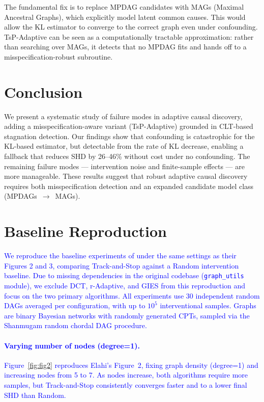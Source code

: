 \documentclass{article}
\newcommand{\added}[1]{\textcolor{blue}{#1}}
\begin{document}
The fundamental fix is to replace MPDAG candidates with MAGs (Maximal Ancestral Graphs), which explicitly model latent common causes. This would allow the KL estimator to converge to the correct graph even under confounding. TsP-Adaptive can be seen as a computationally tractable approximation: rather than searching over MAGs, it detects that no MPDAG fits and hands off to a misspecification-robust subroutine.

\section{Conclusion}
We present a systematic study of failure modes in adaptive causal discovery, adding a misspecification-aware variant (TsP-Adaptive) grounded in CLT-based stagnation detection. Our findings show that confounding is catastrophic for the KL-based estimator, but detectable from the rate of KL decrease, enabling a fallback that reduces SHD by 26--46\% without cost under no confounding. The remaining failure modes — intervention noise and finite-sample effects — are more manageable. These results suggest that robust adaptive causal discovery requires both misspecification detection and an expanded candidate model class (MPDAGs~$\to$~MAGs).




\appendix

\section{Baseline Reproduction}
\label{app:baseline}

\added{We reproduce the baseline experiments of \citet{elahi2024adaptive} under the same settings as their Figures 2 and 3, comparing Track-and-Stop against a Random intervention baseline. Due to missing dependencies in the original codebase (\texttt{graph\_utils} module), we exclude DCT, r-Adaptive, and GIES from this reproduction and focus on the two primary algorithms. All experiments use 30 independent random DAGs averaged per configuration, with up to $10^5$ interventional samples. Graphs are binary Bayesian networks with randomly generated CPTs, sampled via the Shanmugam random chordal DAG procedure.}

\paragraph{\added{Varying number of nodes (degree=1).}}
\added{Figure~\ref{fig:fig2} reproduces Elahi's Figure~2, fixing graph density (degree=1) and increasing nodes from 5 to 7. As nodes increase, both algorithms require more samples, but Track-and-Stop consistently converges faster and to a lower final SHD than Random.}
\end{document}
